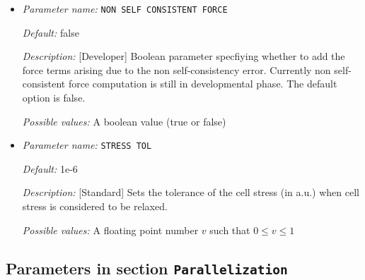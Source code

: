 \begin{itemize}
{\it Possible values:} Any string
\item {\it Parameter name:} {\tt NON SELF CONSISTENT FORCE}
\label{parameters:Geometry/Optimization/NON SELF CONSISTENT FORCE}
\label{parameters:Geometry/Optimization/NON_20SELF_20CONSISTENT_20FORCE}




{\it Default:} false


{\it Description:} [Developer] Boolean parameter specfiying whether to add the force terms arising due to the non self-consistency error. Currently non self-consistent force computation is still in developmental phase. The default option is false.


{\it Possible values:} A boolean value (true or false)
\item {\it Parameter name:} {\tt STRESS TOL}
\label{parameters:Geometry/Optimization/STRESS TOL}
\label{parameters:Geometry/Optimization/STRESS_20TOL}




{\it Default:} 1e-6


{\it Description:} [Standard] Sets the tolerance of the cell stress (in a.u.) when cell stress is considered to be relaxed.


{\it Possible values:} A floating point number $v$ such that $0 \leq v \leq 1$
\end{itemize}

\subsection{Parameters in section \tt Parallelization}
\label{parameters:Parallelization}

